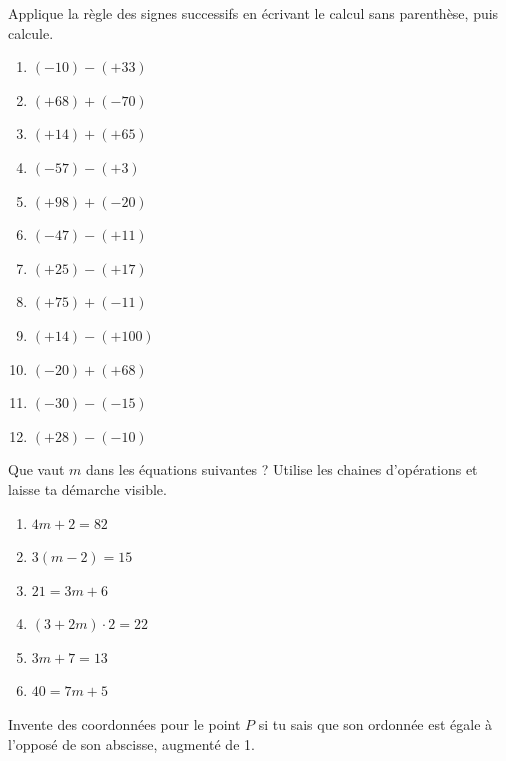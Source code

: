 \documentclass[10pt,a4paper]{article}
\begin{document}
\begin{exercise}
	Applique la règle des signes successifs en écrivant le calcul sans parenthèse, puis calcule.
	\begin{enumerate}[cols=3]
		\item $(-10)-(+33)$
		\item $(+68)+(-70)$
		\item $(+14)+(+65)$
		\item $(-57)-(+3)$
		\item $(+98)+(-20)$
		\item $(-47)-(+11)$
		\item $(+25)-(+17)$
		\item $(+75)+(-11)$
		\item $(+14)-(+100)$
		\item $(-20)+(+68)$
		\item $(-30) - (-15)$
		\item $(+28)-(-10)$
	\end{enumerate}
\end{exercise}

\begin{exercise}
	Que vaut \(m\) dans les équations suivantes ? Utilise les chaines d’opérations et laisse ta démarche visible.
	\begin{enumerate}[cols=3]
		\item \(4m+2=82\)
		\item \(3(m-2)=15\)
		\item \(21=3m+6\)
		\item \((3+2m)\cdot 2=22\)
		\item \(3m + 7 = 13\)
		\item \(40=7m + 5\)
	\end{enumerate}
\end{exercise}

\begin{exercise}
    Invente des coordonnées pour le point $P$ si tu sais que son ordonnée est égale à l'opposé de son abscisse, augmenté de 1.
\end{exercise}
\end{document}
